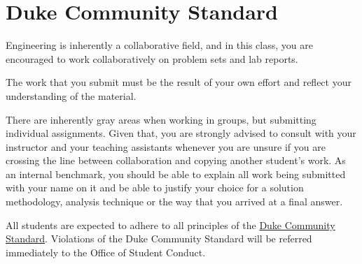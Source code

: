 \section{Duke Community Standard}
Engineering is inherently a collaborative field, and in this class, you are
encouraged to work collaboratively on problem sets and lab reports.
 
The work that you submit must be the result of your own effort and reflect
your understanding of the material.  
  
There are inherently gray areas when working in groups, but submitting
individual assignments.   Given that, you are strongly advised to consult with
your instructor and your teaching assistants whenever you are unsure if you are
crossing the line between collaboration and copying another student's work.  As an
internal benchmark, you should be able to explain all work being submitted with
your name on it and be able to justify your choice for a solution methodology,
analysis technique or the way that you arrived at a final answer.

All students are expected to adhere to all principles of the
\href{http://www.integrity.duke.edu/standard.html}{Duke Community Standard}.
Violations of the Duke Community Standard will be referred immediately to the
Office of Student Conduct.
